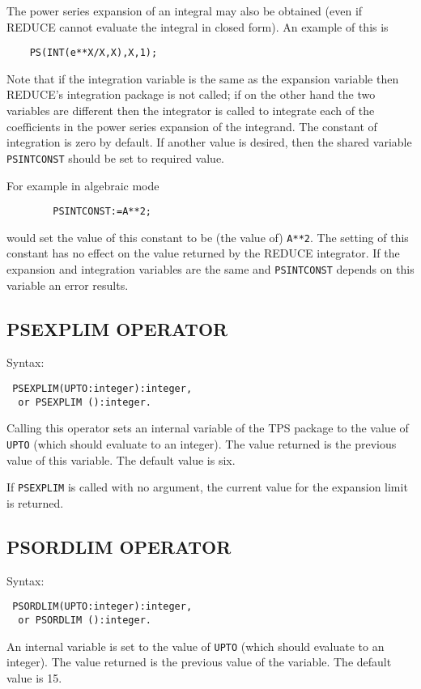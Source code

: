The power series expansion of an integral may also be obtained (even if
REDUCE cannot evaluate the integral in closed form).  An example of
this is
\begin{verbatim}
    PS(INT(e**X/X,X),X,1);
\end{verbatim}
 
Note that if the integration variable is the same as the expansion
variable then REDUCE's integration package is not called; if on the
other hand the two variables are different then the integrator is
called to integrate each of the coefficients in the power series
expansion of the integrand.  The constant of integration is zero by
default.  If another value is desired, then the shared variable {\tt
PSINTCONST} should be set to required value.

For example in algebraic mode
\begin{verbatim}
        PSINTCONST:=A**2;
\end{verbatim}
would set the value of this constant to be (the value of) {\tt A**2}.
The setting of this constant has no effect on the value returned by
the REDUCE integrator. If the expansion and integration variables are
the same and {\tt PSINTCONST} depends on this variable an error
results.
 
 
\subsection*{PSEXPLIM OPERATOR}

Syntax:
\begin{verbatim}
 PSEXPLIM(UPTO:integer):integer,
  or PSEXPLIM ():integer.
\end{verbatim} 
Calling this operator sets an internal variable of the
TPS package to the value of {\tt
UPTO} (which should evaluate to an integer).  The value returned is
the previous value of this variable.  The default value is six.
 
If {\tt PSEXPLIM} is called with no argument, the current value for
the expansion limit is returned.
 

\subsection*{PSORDLIM OPERATOR}

Syntax:
\begin{verbatim}
 PSORDLIM(UPTO:integer):integer,
  or PSORDLIM ():integer.
\end{verbatim}
An internal variable is set to the value of {\tt UPTO} (which should
evaluate to an integer). The value returned is the previous value of
the variable.  The default value is 15.

